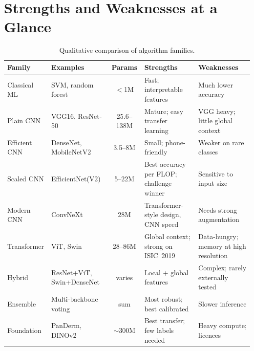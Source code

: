 \documentclass[10pt,a4paper]{article}
\begin{document}
\section{Strengths and Weaknesses at a Glance}
\begin{table}[H]
\centering
\caption{Qualitative comparison of algorithm families.}
\renewcommand{\arraystretch}{1.22}
\small
\begin{tabularx}{\linewidth}{@{}L{2.5cm} L{2.4cm} c L{3.4cm} Y@{}}
\toprule
\textbf{Family} & \textbf{Examples} & \textbf{Params} & \textbf{Strengths} & \textbf{Weaknesses} \\
\midrule
Classical ML & SVM, random forest & $<$1M & Fast; interpretable features & Much lower accuracy \\
Plain CNN & VGG16, ResNet-50 & 25.6--138M & Mature; easy transfer learning & VGG heavy; little global context \\
Efficient CNN & DenseNet, MobileNetV2 & 3.5--8M & Small; phone-friendly & Weaker on rare classes \\
Scaled CNN & EfficientNet(V2) & 5--22M & Best accuracy per FLOP; challenge winner & Sensitive to input size \\
Modern CNN & ConvNeXt & 28M & Transformer-style design, CNN speed & Needs strong augmentation \\
Transformer & ViT, Swin & 28--86M & Global context; strong on ISIC~2019 & Data-hungry; memory at high resolution \\
Hybrid & ResNet+ViT, Swin+DenseNet & varies & Local + global features & Complex; rarely externally tested \\
Ensemble & Multi-backbone voting & sum & Most robust; best calibrated & Slower inference \\
Foundation & PanDerm, DINOv2 & $\sim$300M & Best transfer; few labels needed & Heavy compute; licences \\
\bottomrule
\end{tabularx}
\end{table}

\end{document}
